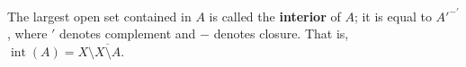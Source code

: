 The largest open set contained in $A$ is called the \textbf{interior} of $A$; it is equal to $A'^{-'}$, where $'$ denotes complement and $-$ denotes closure. That is, $\operatorname{int}(A) = X \setminus \overline{X \setminus A}$.
